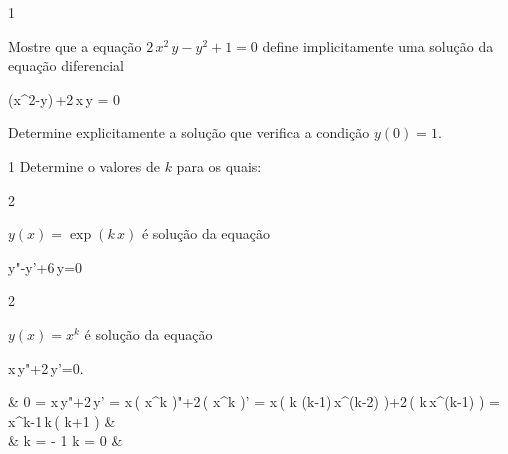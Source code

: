 \documentclass["./AM3C.exercises_resolutions.2024.tex"]{subfiles}
\begin{document}
\begin{questionBox}1{ %
	Mostre que a equação \(2\,x^2\,y - y^2 + 1 = 0\) define implicitamente uma solução da equação diferencial
	\begin{BM}
		(x^2-y)\,+2\,x\,y = 0
	\end{BM}
	Determine explicitamente a solução que verifica a condição \(y(0)=1\).
	} %
	\answer{}
\end{questionBox}

\begin{questionBox}1{ %
	Determine o valores de \(k\) para os quais:
	} %
	\begin{questionBox}2{ %
		\(y(x)=\exp{(k\,x)}\) é solução da equação
		\begin{BM}
			y"-y'+6\,y=0
		\end{BM}
		} %
	\end{questionBox}
	\begin{questionBox}2{ %
		\(y(x)=x^k\) é solução da equação
		\begin{BM}
			x\,y"+2\,y'=0.
		\end{BM}
		} %
		\answer{}
		\begin{flalign*}
			         &
			0
			= x\,y"+2\,y'
			= x\,(
			x^k
			)"+2\,(
			x^k
			)'
			= x\,(
			k\,\,(k-1)\,x^(k-2)
			)+2\,(
			k\,x^(k-1)
			)
			= x^{k-1}\,k\,(
			k+1
			)
			\implies & \\&
			\implies
			k = - 1 \lor k = 0
			         &
		\end{flalign*}
	\end{questionBox}
\end{questionBox}
\end{document}
